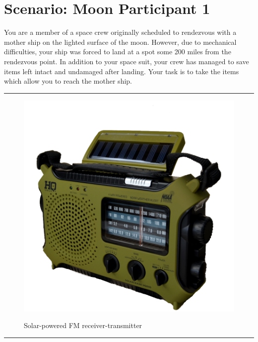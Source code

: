 \documentclass{article}
\begin{document}
    \section*{Scenario: \textmd{Moon} \hfill Participant \textmd{1}}
    \Large You are a member of a space crew originally scheduled to rendezvous with a mother ship on the lighted surface of the moon. However, due to mechanical difficulties, your ship was forced to land at a spot some 200 miles from the rendezvous point. In addition to your space suit, your crew has managed to save items left intact and undamaged after landing. Your task is to take the items which allow you to reach the mother ship.
\clearpage
        \par\noindent\rule{\textwidth}{0.4pt}
    \begin{figure}[H]
        \centering
        \begin{minipage}{0.25\textwidth}
            \centering
            \includegraphics[width=\textwidth]{../SurvivalItemImages/transmitter}
        \end{minipage}\hfill
        \begin{minipage}{0.7\textwidth}
            \centering
            \Large Solar-powered FM receiver-transmitter
        \end{minipage}
    \end{figure}
    \vspace{-0.8em}
    \noindent\rule{\textwidth}{0.4pt}
            
\end{document}

